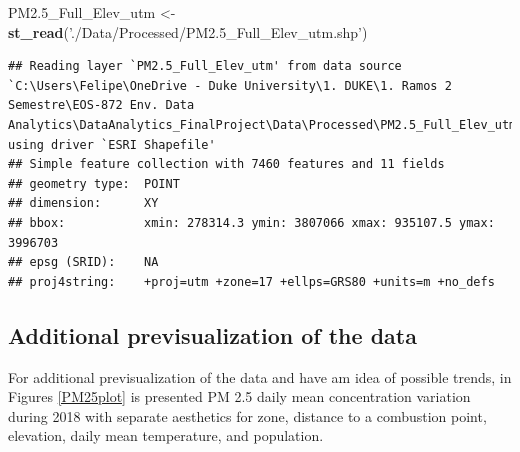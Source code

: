\documentclass[12pt,]{article}
\newenvironment{Shaded}{\begin{snugshade}}{\end{snugshade}}
\newcommand{\KeywordTok}[1]{\textcolor[rgb]{0.13,0.29,0.53}{\textbf{#1}}}
\newcommand{\StringTok}[1]{\textcolor[rgb]{0.31,0.60,0.02}{#1}}
\newcommand{\NormalTok}[1]{#1}
\begin{document}
\begin{Shaded}
\begin{Highlighting}[]
\NormalTok{PM2.5_Full_Elev_utm <-}\StringTok{ }\KeywordTok{st_read}\NormalTok{(}\StringTok{'./Data/Processed/PM2.5_Full_Elev_utm.shp'}\NormalTok{) }
\end{Highlighting}
\end{Shaded}

\begin{verbatim}
## Reading layer `PM2.5_Full_Elev_utm' from data source `C:\Users\Felipe\OneDrive - Duke University\1. DUKE\1. Ramos 2 Semestre\EOS-872 Env. Data Analytics\DataAnalytics_FinalProject\Data\Processed\PM2.5_Full_Elev_utm.shp' using driver `ESRI Shapefile'
## Simple feature collection with 7460 features and 11 fields
## geometry type:  POINT
## dimension:      XY
## bbox:           xmin: 278314.3 ymin: 3807066 xmax: 935107.5 ymax: 3996703
## epsg (SRID):    NA
## proj4string:    +proj=utm +zone=17 +ellps=GRS80 +units=m +no_defs
\end{verbatim}

\subsection{Additional previsualization of the
data}\label{additional-previsualization-of-the-data}

For additional previsualization of the data and have am idea of possible
trends, in Figures \autoref{PM25plot} is presented PM 2.5 daily mean
concentration variation during 2018 with separate aesthetics for zone,
distance to a combustion point, elevation, daily mean temperature, and
population.
\end{document}

